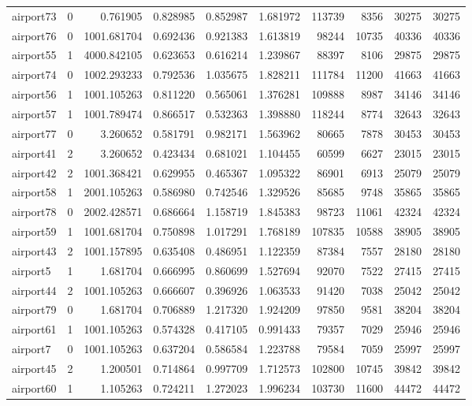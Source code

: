 \documentclass[../../../thesis.tex]{subfiles}
\begin{document}
\begin{longtable}{|l|r|r|r|r|r|r|r|r|r|}
airport73 & 0 & 0.761905 & 0.828985 & 0.852987 & 1.681972 & 113739 & 8356 & 30275 & 30275 \\
airport76 & 0 & 1001.681704 & 0.692436 & 0.921383 & 1.613819 & 98244 & 10735 & 40336 & 40336 \\
airport55 & 1 & 4000.842105 & 0.623653 & 0.616214 & 1.239867 & 88397 & 8106 & 29875 & 29875 \\
airport74 & 0 & 1002.293233 & 0.792536 & 1.035675 & 1.828211 & 111784 & 11200 & 41663 & 41663 \\
airport56 & 1 & 1001.105263 & 0.811220 & 0.565061 & 1.376281 & 109888 & 8987 & 34146 & 34146 \\
airport57 & 1 & 1001.789474 & 0.866517 & 0.532363 & 1.398880 & 118244 & 8774 & 32643 & 32643 \\
airport77 & 0 & 3.260652 & 0.581791 & 0.982171 & 1.563962 & 80665 & 7878 & 30453 & 30453 \\
airport41 & 2 & 3.260652 & 0.423434 & 0.681021 & 1.104455 & 60599 & 6627 & 23015 & 23015 \\
airport42 & 2 & 1001.368421 & 0.629955 & 0.465367 & 1.095322 & 86901 & 6913 & 25079 & 25079 \\
airport58 & 1 & 2001.105263 & 0.586980 & 0.742546 & 1.329526 & 85685 & 9748 & 35865 & 35865 \\
airport78 & 0 & 2002.428571 & 0.686664 & 1.158719 & 1.845383 & 98723 & 11061 & 42324 & 42324 \\
airport59 & 1 & 1001.681704 & 0.750898 & 1.017291 & 1.768189 & 107835 & 10588 & 38905 & 38905 \\
airport43 & 2 & 1001.157895 & 0.635408 & 0.486951 & 1.122359 & 87384 & 7557 & 28180 & 28180 \\
airport5 & 1 & 1.681704 & 0.666995 & 0.860699 & 1.527694 & 92070 & 7522 & 27415 & 27415 \\
airport44 & 2 & 1001.105263 & 0.666607 & 0.396926 & 1.063533 & 91420 & 7038 & 25042 & 25042 \\
airport79 & 0 & 1.681704 & 0.706889 & 1.217320 & 1.924209 & 97850 & 9581 & 38204 & 38204 \\
airport61 & 1 & 1001.105263 & 0.574328 & 0.417105 & 0.991433 & 79357 & 7029 & 25946 & 25946 \\
airport7 & 0 & 1001.105263 & 0.637204 & 0.586584 & 1.223788 & 79584 & 7059 & 25997 & 25997 \\
airport45 & 2 & 1.200501 & 0.714864 & 0.997709 & 1.712573 & 102800 & 10745 & 39842 & 39842 \\
airport60 & 1 & 1.105263 & 0.724211 & 1.272023 & 1.996234 & 103730 & 11600 & 44472 & 44472 \\

\end{longtable}
\end{document}
